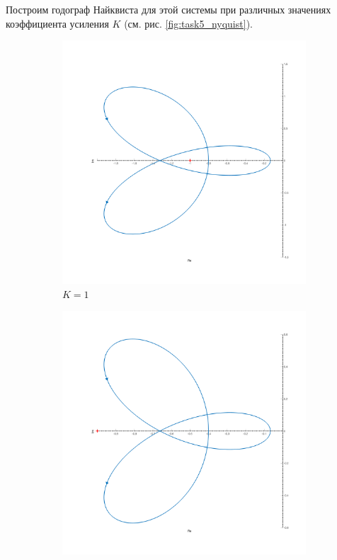 Построим годограф Найквиста для этой системы при различных значениях коэффициента усиления $K$ (см. рис. \ref{fig:task5_nyquist}).
\begin{figure}[ht!]
    \begin{subfigure}{0.5\textwidth}
        \centering
        \includegraphics[width=\textwidth]{media/plots/task5_nyquist_1.png}
        \caption{$K = 1$}
    \end{subfigure}
    \begin{subfigure}{0.5\textwidth}
        \centering
        \includegraphics[width=\textwidth]{media/plots/task5_nyquist_2.png}

\end{subfigure}
\end{figure}
